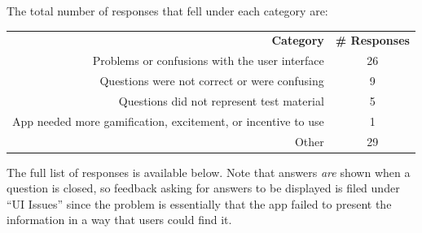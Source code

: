 \par The total number of responses that fell under each category are:

\vspace{1.0cm}

\begin{tabular}{ r c }
	\textbf{Category} & \textbf{\# Responses} \\
	Problems or confusions with the user interface & 26 \\
	Questions were not correct or were confusing  & 9 \\
	Questions did not represent test material  & 5 \\
	App needed more gamification, excitement, or incentive to use  & 1 \\
	Other  & 29 \\
\end{tabular}

\vspace{2.0cm}

\par The full list of responses is available below. Note that answers \textit{are} shown when a question is closed, so feedback asking for answers to be displayed is filed under ``UI Issues'' since the problem is essentially that the app failed to present the information in a way that users could find it.





 